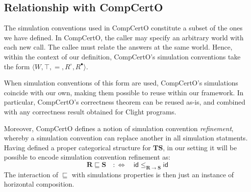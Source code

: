 \documentclass[acmsmall,screen,review,anonymous]{acmart}
\newcommand{\kw}[1]{\ensuremath{ \mathsf{#1} }}
\newcommand{\que}{\circ}
\newcommand{\ans}{\bullet}
\begin{document}


\subsection{Relationship with CompCertO} %

The simulation conventions used in CompCertO
constitute a subset of the ones we have defined.
In CompCertO,
the caller may specify an arbitrary world with each new call.
The callee must relate the answers at the same world.
Hence,
within the context of our definition,
CompCertO's simulation conventions
take the form $\langle W, \top, {=}, R^\que, R^\ans \rangle$.

When simulation conventions of this form are used,
CompCertO's simulations coincide with our own,
making them possible to reuse within our framework.
In particular,
CompCertO's correctness theorem can be reused as-is,
and combined with any correctness result
obtained for Clight programs.

Moreover,
CompCertO defines a notion of simulation convention \emph{refinement},
whereby a simulation convention
can replace another in all simulation statments.
Having defined a proper categorical structure for $\mathbf{TS}$,
in our setting
it will be possible to encode simulation convention refinement as:
\[
  \mathbf{R} \sqsubseteq \mathbf{S} \quad :\Leftrightarrow \quad
    \kw{id} \le_{\mathbf{R} \rightarrow \mathbf{S}} \kw{id}
\]
The interaction of $\sqsubseteq$ with simulations properties
is then just an instance of horizontal composition.
\end{document}
